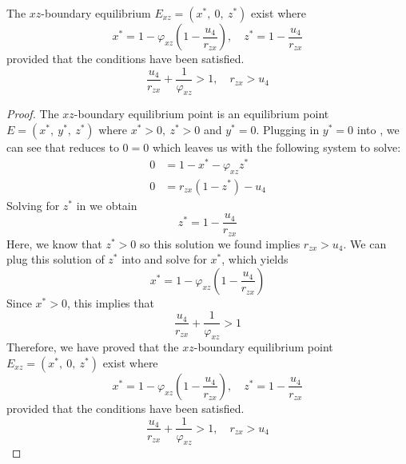 \begin{theorem}\label{thm:boundary-xz-exist}
    The $xz$-boundary equilibrium $E_{xz}=\left(x^*,\ 0,\ z^*\right)$ exist where
    \begin{equation*}
        x^*=1-\varphi_{xz}\left(1-\frac{u_4}{r_{zx}}\right),\quad
        z^*=1-\frac{u_4}{r_{zx}}
    \end{equation*}
    provided that the conditions have been satisfied.
    \begin{equation*}
        \frac{u_4}{r_{zx}}+\frac{1}{\varphi_{xz}} > 1,\quad 
        r_{zx}>u_4
    \end{equation*}
\end{theorem}
\begin{proof}
    The $xz$-boundary equilibrium point is an equilibrium point $E=\left(x^*,\ y^*,\ z^*\right)$ where $x^*>0,\ z^*>0$ and $y^*=0$. Plugging in $y^*=0$ into , we can see that  reduces to $0=0$ which leaves us with the following system to solve:
    \begin{subequations}\label{system:xz-boundary}
        \begin{align}
            0 &= 1-x^*-\varphi_{xz}z^* \label{eq:xz-boundary-x}\\
            0 &= r_{zx}\left(1-z^*\right)-u_4 \label{eq:xz-boundary-z}
        \end{align}
    \end{subequations}
    Solving for $z^*$ in  we obtain
    \begin{equation*}
        z^*=1-\frac{u_4}{r_{zx}}
    \end{equation*}
    Here, we know that $z^*>0$ so this solution we found implies $r_{zx}>u_4$. We can plug this solution of $z^*$ into  and solve for $x^*$, which yields 
    \begin{equation*}
        x^*=1-\varphi_{xz}\left(1-\frac{u_4}{r_{zx}}\right)
    \end{equation*}
    Since $x^*>0$, this implies that
    \begin{equation*}
        \frac{u_4}{r_{zx}}+\frac{1}{\varphi_{xz}} > 1
    \end{equation*}
    Therefore, we have proved that the $xz$-boundary equilibrium point $E_{xz}=\left(x^*,\ 0,\ z^*\right)$ exist where 
    \begin{equation*}
        x^*=1-\varphi_{xz}\left(1-\frac{u_4}{r_{zx}}\right),\quad z^*=1-\frac{u_4}{r_{zx}}
    \end{equation*}
    provided that the conditions have been satisfied.
    \begin{equation*}
        \frac{u_4}{r_{zx}}+\frac{1}{\varphi_{xz}} > 1,\quad 
        r_{zx}>u_4
    \end{equation*}
\end{proof}

